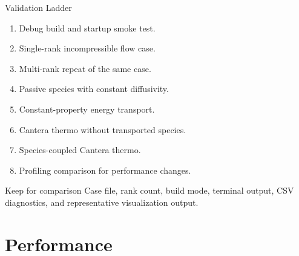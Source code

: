 \documentclass[aspectratio=169,11pt]{beamer}
\begin{document}
\begin{frame}{Validation Ladder}
  \begin{enumerate}
    \item Debug build and startup smoke test.
    \item Single-rank incompressible flow case.
    \item Multi-rank repeat of the same case.
    \item Passive species with constant diffusivity.
    \item Constant-property energy transport.
    \item Cantera thermo without transported species.
    \item Species-coupled Cantera thermo.
    \item Profiling comparison for performance changes.
  \end{enumerate}

  \begin{block}{Keep for comparison}
    Case file, rank count, build mode, terminal output, CSV diagnostics, and
    representative visualization output.
  \end{block}
\end{frame}

\section{Performance}
\end{document}
